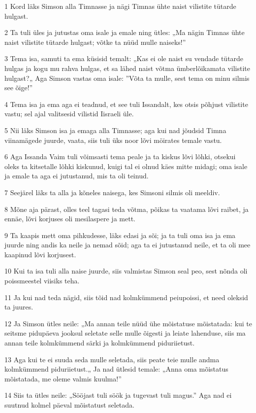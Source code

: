 \par 1 Kord läks Simson alla Timnasse ja nägi Timnas ühte naist vilistite tütarde hulgast.
\par 2 Ta tuli üles ja jutustas oma isale ja emale ning ütles: „Ma nägin Timnas ühte naist vilistite tütarde hulgast; võtke ta nüüd mulle naiseks!”
\par 3 Tema isa, samuti ta ema küsisid temalt: „Kas ei ole naist su vendade tütarde hulgas ja kogu mu rahva hulgas, et sa lähed naist võtma ümberlõikamata vilistite hulgast?„ Aga Simson vastas oma isale: ”Võta ta mulle, sest tema on minu silmis see õige!”
\par 4 Tema isa ja ema aga ei teadnud, et see tuli Issandalt, kes otsis põhjust vilistite vastu; sel ajal valitsesid vilistid Iisraeli üle.
\par 5 Nii läks Simson isa ja emaga alla Timnasse; aga kui nad jõudsid Timna viinamägede juurde, vaata, siis tuli üks noor lõvi möirates temale vastu.
\par 6 Aga Issanda Vaim tuli võimsasti tema peale ja ta kiskus lõvi lõhki, otsekui oleks ta kitsetalle lõhki kiskunud, kuigi tal ei olnud käes mitte midagi; oma isale ja emale ta aga ei jutustanud, mis ta oli teinud.
\par 7 Seejärel läks ta alla ja kõneles naisega, kes Simsoni silmis oli meeldiv.
\par 8 Mõne aja pärast, olles teel tagasi teda võtma, põikas ta vaatama lõvi raibet, ja ennäe, lõvi korjuses oli mesilaspere ja mett.
\par 9 Ta kaapis mett oma pihkudesse, läks edasi ja sõi; ja ta tuli oma isa ja ema juurde ning andis ka neile ja nemad sõid; aga ta ei jutustanud neile, et ta oli mee kaapinud lõvi korjusest.
\par 10 Kui ta isa tuli alla naise juurde, siis valmistas Simson seal peo, sest nõnda oli poissmeestel viisiks teha.
\par 11 Ja kui nad teda nägid, siis tõid nad kolmkümmend peiupoissi, et need oleksid ta juures.
\par 12 Ja Simson ütles neile: „Ma annan teile nüüd ühe mõistatuse mõistatada: kui te seitsme pidupäeva jooksul seletate selle mulle õigesti ja leiate lahenduse, siis ma annan teile kolmkümmend särki ja kolmkümmend piduriietust.
\par 13 Aga kui te ei suuda seda mulle seletada, siis peate teie mulle andma kolmkümmend piduriietust.„ Ja nad ütlesid temale: „Anna oma mõistatus mõistatada, me oleme valmis kuulma!”
\par 14 Siis ta ütles neile: „Sööjast tuli söök ja tugevast tuli magus.” Aga nad ei suutnud kolmel päeval mõistatust seletada.
